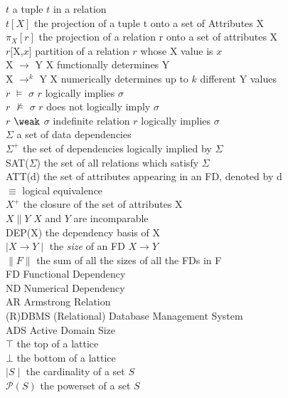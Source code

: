 \begin{symbolindex}
{\begin{tabbing}
$t$ \>    		 a tuple $t$ in a relation\\
$t[X]$ \>  		 the projection of a tuple t onto a set of Attributes X\\
$\pi_X[r]$ \> 		 the projection of a relation r onto a set of
attributes X\\
$r[$X,$x]$ \>		 partition of a relation $r$ whose X value is $x$ \\
X $\to$ Y \> 	   	 X functionally determines Y\\
X $\to^k$ Y \> 	   	 X numerically determines up to $k$ different
Y values\\
$r$ $\models$ $\sigma$ \>  	 $r$ logically implies $\sigma$ \\
$r$ $\not \models$ $\sigma$ \>   $r$ does not logically imply $\sigma$ \\
$r$ $\weak$ $\sigma$ \>   indefinite relation $r$ logically implies $\sigma$ \\
$\Sigma$ \>  		 a set of data dependencies\\
$\Sigma^+$ \>		   the set of dependencies logically implied by $\Sigma$\\
SAT($\Sigma$) \>	 the set of all relations which satisfy $\Sigma$ \\
ATT(d)  \> 		  the set of attributes appearing in an FD, denoted by d \\
$\equiv$        \>   	logical equivalence \\
$X^+$   \>   		the  closure of the set of attributes X \\
$X \| Y$        \>     $X$ and $Y$ are incomparable \\
DEP(X)  \>   		 the dependency  basis of X \\
$\mid X \to Y \mid $\>   the {\em size} of an FD  $X \to Y$ \\
$\| F \|$\>   the sum of all the sizes of all the FDs in F \\
 FD \>			Functional Dependency \\
 ND \>			Numerical Dependency \\
 AR \>			Armstrong Relation \\
 (R)DBMS \>		(Relational) Database Management System \\
 ADS \>			Active Domain Size \\
 $\top$ \>		the top of a lattice \\
 $\bot$ \>		the bottom of a lattice \\
 $\mid S \mid$ \>	the cardinality of a set $S$ \\
 ${\mathcal P}(S)$ \>	the powerset of a set $S$ \\

\end{tabbing}}
\end{symbolindex}

